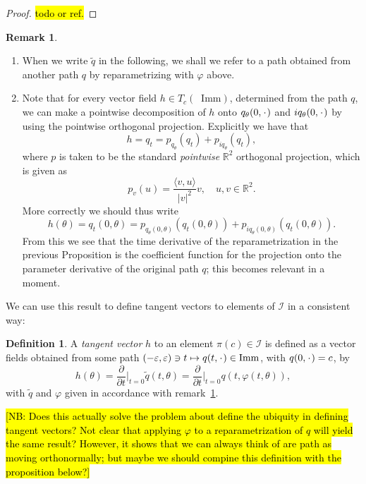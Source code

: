\documentclass[a4,danish]{article}
\theoremstyle{break}
\theoremstyle{definition}
\newtheorem{definition}[subsection]{Definition}
\theoremstyle{Break}
\newtheorem{remark}[subsection]{Remark}
\newcommand{\R}{\mathbb{R}}
\newcommand*\I{\mathop{}\!\mathrm{Imm}}
\newcommand{\blank}{\makebox[1ex]{\textbf{$\cdot$}}}
\renewcommand{\phi}{\varphi}
\renewcommand{\epsilon}{\varepsilon}
\begin{document}
\begin{proof}
  \hl{todo or ref.}
\end{proof}

\begin{remark}
  \label{remark:ortho-decom}
  \begin{enumerate}
  \item  When we write $\tilde{q}$ in the following, we shall we refer to a path obtained from another path $q$ by reparametrizing with $\phi$ above. 
  \item Note that for every vector field $h \in T_c(\I)$, determined from the path $q$, we can make a pointwise decomposition of $h$ onto $q_{\theta}(0, \blank)$ and $iq_{\theta}(0, \blank)$ by using the pointwise orthogonal projection. Explicitly we have that
  \begin{equation*}
    h = q_t = p_{q_{\theta}}(q_{t}) + p_{iq_{\theta}}(q_{t}), 
  \end{equation*}
  where $p$ is taken to be the standard \textit{pointwise} $\R^2$ orthogonal projection, which is given as
  \begin{equation*}
    p_v(u) = \frac{\langle v, u \rangle}{|v|^2} v, \quad u, v \in \R^2.
  \end{equation*}
  More correctly we should thus write
  \begin{equation*}
    h(\theta) = q_t(0,\theta) = p_{q_{\theta}(0,\theta)}(q_{t}(0,\theta)) +
    p_{iq_{\theta}(0,\theta)}(q_{t}(0,\theta)).
  \end{equation*}
  From this we see that the time derivative of the reparametrization in the previous Proposition is the coefficient function for the projection onto the parameter derivative of the original path $q$; this becomes relevant in a moment.
\end{enumerate}
\end{remark}

We can use this result to define tangent vectors to elements of $\mathcal{I}$ in
a consistent way:

\begin{definition}
  \label{def:tang-quotient}
  A \textit{tangent vector} $h$ to an element $\pi(c) \in \mathcal{I}$ is defined as a vector fields obtained from some path $(-\epsilon, \epsilon) \ni t \mapsto q(t, \blank) \in \I$, with $q(0,\blank) = c$, by
  \begin{equation}
    \label{eq:tang-quotient}
    h(\theta) = \frac{\partial }{\partial t} \bigg\vert_{t=0} \tilde{q}(t,\theta)
    = \frac{\partial }{\partial t} \bigg\vert_{t=0} q(t, \phi(t,\theta)),
  \end{equation}
  with $\tilde{q}$ and $\phi$ given in accordance with remark~\ref{remark:ortho-decom}.

  \hl{[NB: Does this actually solve the problem about define the ubiquity in defining tangent vectors? Not clear that applying $\phi$ to a reparametrization of $q$ will yield the same result? However, it shows that we can always think of are path as moving orthonormally; but maybe we should compine this definition with the proposition below?]}
\end{definition}
\end{document}
